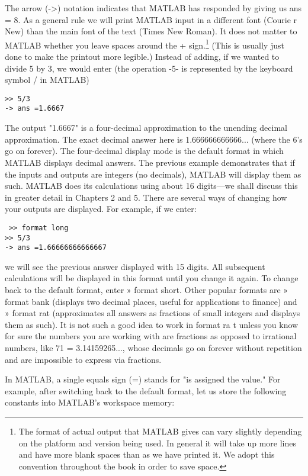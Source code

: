 \documentclass[../main.tex]{subfiles}
\begin{document}
\noindent The arrow (->) notation indicates that MATLAB has responded by giving us
ans = 8. As a general rule we will print MATLAB input in a different font
(Courie r New) than the main font of the text (Times New Roman). It does not
matter to MATLAB whether you leave spaces around the + sign.\footnote[3]{ The format of actual output that MATLAB gives can vary slightly depending on the platform and
version being used. In general it will take up more lines and have more blank spaces than as we have
printed it. We adopt this convention throughout the book in order to save space.}
 (This is usually
just done to make the printout more legible.) Instead of adding, if we wanted to
divide 5 by 3, we would enter (the operation -5- is represented by the keyboard
symbol / in MATLAB)
 
 \begin{verbatim}
>> 5/3
-> ans =1.6667 
\end{verbatim}

The output "1.6667" is a four-decimal approximation to the unending decimal
approximation. The exact decimal answer here is 1.666666666666... (where the
6's go on forever). The four-decimal display mode is the default format in which
MATLAB displays decimal answers. The previous example demonstrates that if
the inputs and outputs are integers (no decimals), MATLAB will display them as
such. MATLAB does its calculations using about 16 digits—we shall discuss
this in greater detail in Chapters 2 and 5. There are several ways of changing how
your outputs are displayed. For example, if we enter: 

\begin{verbatim}
 >> format long 
>> 5/3
-> ans =1.66666666666667 
\end{verbatim}

\noindent we will see the previous answer displayed with 15 digits. All subsequent
calculations will be displayed in this format until you change it again. To change
back to the default format, enter » format short. Other popular formats are
» format bank (displays two decimal places, useful for applications to
finance) and » format rat (approximates all answers as fractions of small
integers and displays them as such). It is not such a good idea to work in
format ra t unless you know for sure the numbers you are working with are
fractions as opposed to irrational numbers, like 71 = 3.14159265..., whose
decimals go on forever without repetition and are impossible to express via
fractions.

In MATLAB, a single equals sign (=) stands for "is assigned the value." For
example, after switching back to the default format, let us store the following
constants into MATLAB's workspace memory: 
\end{document}
